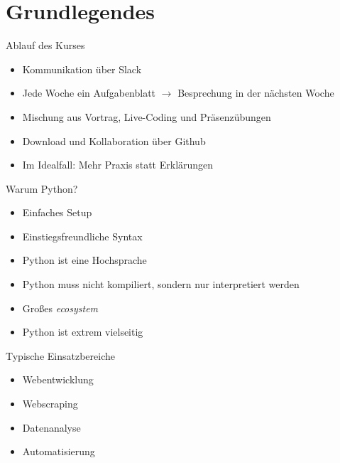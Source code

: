 \documentclass[algorithm,pgfplots,colortheme=dark]{cuzbeamer}
\begin{document}

\maketitle

\section{Grundlegendes}

\begin{frame}
	\begin{block}{Ablauf des Kurses}
		\begin{itemize}
			\item Kommunikation über Slack 
			\item Jede Woche ein Aufgabenblatt $\rightarrow$ Besprechung in der nächsten Woche
			\item Mischung aus Vortrag, Live-Coding und Präsenzübungen
			\item Download und Kollaboration über Github
			\item Im Idealfall: Mehr Praxis statt Erklärungen
		\end{itemize}
	\end{block}
\end{frame}

\begin{frame}
	\begin{block}{Warum Python?}
		\begin{itemize}
			\item Einfaches Setup
			\item Einstiegsfreundliche Syntax
			\item Python ist eine Hochsprache
			\item Python muss nicht kompiliert, sondern nur interpretiert werden
			\item Großes \textit{ecosystem}
			\item Python ist extrem vielseitig
		\end{itemize}
	\end{block}
\end{frame}

\begin{frame}
	\begin{block}{Typische Einsatzbereiche}
		\begin{itemize}
		\item Webentwicklung
		\item Webscraping
		\item Datenanalyse
		\item Automatisierung
		\end{itemize}
	\end{block}
\end{frame}
\end{document}
